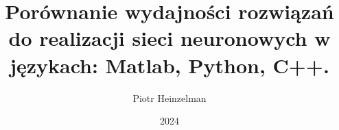 \documentclass[thesis=inz,faculty=ee]{EE-dyplom}
\title{Porównanie wydajności rozwiązań do realizacji sieci neuronowych w językach: Matlab, Python, C++.}
\author{Piotr Heinzelman}
\date{2024}
\begin{document}
    \frontpages

    

    \bibliografia

    
    \acronymslist
    \listoffigures
    \listoftables
    \easyappendices
\end{document}
